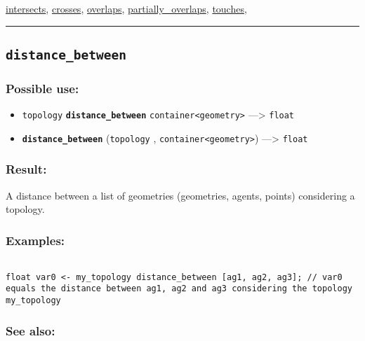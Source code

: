 \documentclass[]{book}
\providecommand{\tightlist}{%
  \setlength{\itemsep}{0pt}\setlength{\parskip}{0pt}}
\theoremstyle{definition}
\theoremstyle{definition}
\theoremstyle{definition}
\theoremstyle{remark}
\begin{document}
\href{OperatorsIM\#intersects}{intersects},
\href{OperatorsBC\#crosses}{crosses},
\href{OperatorsNR\#overlaps}{overlaps},
\href{OperatorsNR\#partially_overlaps}{partially\_overlaps},
\href{OperatorsSZ\#touches}{touches},

\begin{center}\rule{0.5\linewidth}{\linethickness}\end{center}

\subsection{\texorpdfstring{\texttt{distance\_between}}{distance\_between}}\label{distance_between}

\subsubsection{Possible use:}\label{possible-use-135}

\begin{itemize}
\tightlist
\item
  \texttt{topology} \textbf{\texttt{distance\_between}}
  \texttt{container\textless{}geometry\textgreater{}} ---\textgreater{}
  \texttt{float}
\item
  \textbf{\texttt{distance\_between}} (\texttt{topology} ,
  \texttt{container\textless{}geometry\textgreater{}}) ---\textgreater{}
  \texttt{float}
\end{itemize}

\subsubsection{Result:}\label{result-131}

A distance between a list of geometries (geometries, agents, points)
considering a topology.

\subsubsection{Examples:}\label{examples-102}

\begin{verbatim}
 
float var0 <- my_topology distance_between [ag1, ag2, ag3]; // var0 equals the distance between ag1, ag2 and ag3 considering the topology my_topology
\end{verbatim}

\subsubsection{See also:}\label{see-also-80}
\end{document}
